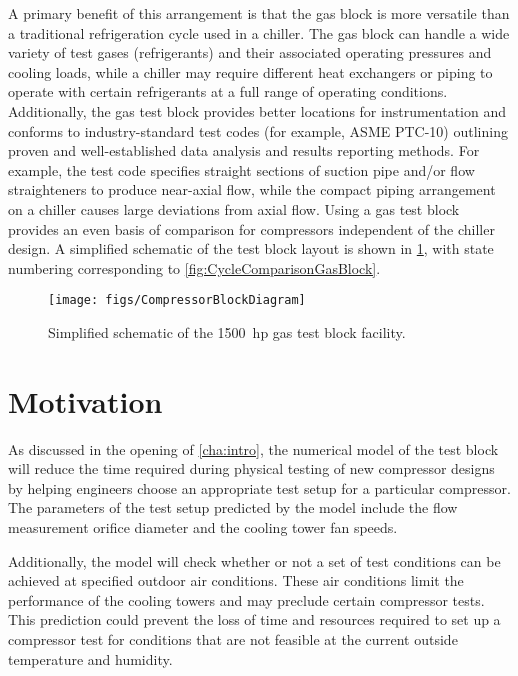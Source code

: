 A primary benefit of this arrangement is that the gas block is 
more versatile than a traditional refrigeration cycle used in a chiller. 
The gas block can handle a wide variety of test gases (refrigerants) 
and their associated operating pressures and cooling loads, 
while a chiller may require different heat exchangers or piping 
to operate with certain refrigerants at a full range of operating conditions.
Additionally, the gas test block provides better locations for instrumentation 
and conforms to industry-standard test codes (for example, ASME%
PTC-10) 
outlining proven and well-established data analysis and results reporting methods. 
For example, the test code specifies straight sections of suction pipe and/or flow straighteners 
to produce near-axial flow, while the compact piping arrangement on a chiller causes large deviations from axial flow. 
Using a gas test block provides an even basis of comparison for compressors independent of the chiller design. 
A simplified schematic of the test block layout is shown in \cref{fig:SimpSchematic}, 
with state numbering corresponding to \cref{fig:CycleComparisonGasBlock}. 
\begin{figure}[htbp]
	\centering
	\texttt{[image: figs/CompressorBlockDiagram]}
	\caption{Simplified schematic of the \SI{1500}{hp} gas test block facility.}
	\label{fig:SimpSchematic}
\end{figure}

\section{Motivation} \label{sec:motivation}
As discussed in the opening of \cref{cha:intro}, 
the numerical model of the test block will reduce the time required during physical testing of new compressor designs 
by helping engineers choose an appropriate test setup for a particular compressor. 
The parameters of the test setup predicted by the model include 
the flow measurement orifice diameter and the cooling tower fan speeds.

Additionally, the model will check whether or not a set of test conditions 
can be achieved at specified outdoor air conditions. 
These air conditions limit the performance of the cooling towers and may preclude certain compressor tests. 
This prediction could prevent the loss of time and resources required to set up a compressor test 
for conditions that are not feasible at the current outside temperature and humidity.

